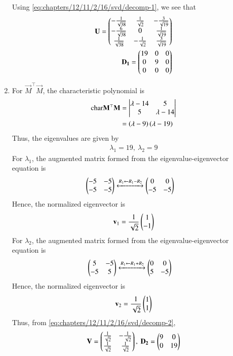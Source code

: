 \begin{enumerate}
        Using \eqref{eq:chapters/12/11/2/16/svd/decomp-1}, we see that
        \begin{align}
            \mathbf{U} = \begin{pmatrix}-\frac{1}{\sqrt{38}}&\frac{1}{\sqrt{2}}&-\frac{3}{\sqrt{19}}\\-\frac{6}{\sqrt{38}}&0&\frac{1}{\sqrt{19}}\\\frac{1}{\sqrt{38}}&-\frac{1}{\sqrt{2}}&\frac{3}{\sqrt{19}}\end{pmatrix} \\
            \mathbf{D_1} = \begin{pmatrix}19&0&0\\0&9&0\\0&0&0\end{pmatrix}
            \label{eq:chapters/12/11/2/16/svd/eig-params-1}
        \end{align}
        \item For $\vec{M}^\top\vec{M}$, the characteristic polynomial is
        \begin{align}
		\text{char}{\mathbf{M}^\top\mathbf{M}} &= \begin{vmatrix}\lambda-14&5\\5&\lambda-14\end{vmatrix} \\
                                      &= \left(\lambda-9\right)\left(\lambda-19\right)
        \end{align}
        Thus, the eigenvalues are given by
        \begin{align}
            \lambda_1 = 19,\ \lambda_2 = 9
            \label{eq:chapters/12/11/2/16/svd/eig-vals}
        \end{align}
        For $\lambda_1$, the augmented matrix formed from the 
        eigenvalue-eigenvector equation is
        \begin{align}
            \begin{pmatrix}-5&-5\\-5&-5\end{pmatrix} &\xleftrightarrow[]{R_1 \leftarrow R_1-R_2} \begin{pmatrix}0&0\\-5&-5\end{pmatrix}
        \end{align}
        Hence, the normalized eigenvector is
        \begin{align}
		\mathbf{v}_1 = \frac{1}{\sqrt{2}}\begin{pmatrix}1\\-1\end{pmatrix}
        \end{align}
        For $\lambda_2$, the augmented matrix formed from the 
        eigenvalue-eigenvector equation is
        \begin{align}
            \begin{pmatrix}5&-5\\-5&5\end{pmatrix} &\xleftrightarrow[]{R_1 \leftarrow R_1+R_2} \begin{pmatrix}0&0\\5&-5\end{pmatrix}
        \end{align}
        Hence, the normalized eigenvector is
        \begin{align}
		\mathbf{v}_2 = \frac{1}{\sqrt{2}}\begin{pmatrix}1\\1\end{pmatrix}
        \end{align}
        Thus, from \eqref{eq:chapters/12/11/2/16/svd/decomp-2},
        \begin{align}
            \mathbf{V} = \begin{pmatrix}\frac{1}{\sqrt{2}}&-\frac{1}{\sqrt{2}}\\\frac{1}{\sqrt{2}}&\frac{1}{\sqrt{2}}\end{pmatrix},\ \mathbf{D_2} = \begin{pmatrix}9&0\\0&19\end{pmatrix}
            \label{eq:chapters/12/11/2/16/svd/eig-params-2}
        \end{align}
    \end{enumerate}
